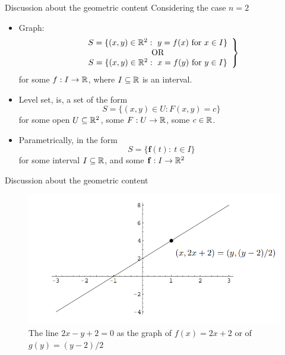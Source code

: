 \begin{frame}{Discussion about the geometric content}
    Considering the case $n = 2$
    \begin{itemize}
        \item Graph: \begin{equation}
        \left. 
        \begin{array}{c}
        S = \{ (x,y) \in \mathbb{R}^2:  \ y = f(x) \text{ for }x\in I\}\\
        \text{OR} \\
        S = \{ (x,y) \in \mathbb{R}^2:  \ x = f(y) \text{ for }y\in I\}
        \end{array}\right\}
        \label{graph}
        \end{equation}
        for some $f:I\to \mathbb{R}$, where $I\subseteq \mathbb{R}$ is an interval.
        \item Level set, is, a set of the form
        \begin{equation}
            S    = \{ (x,y)\in U : F(x,y) = c \} 
        \label{locus}\end{equation}
        for some open $U\subseteq \mathbb{R}^2$, some $F:U\to \mathbb{R}$, some $c\in \mathbb{R}$.
        \item Parametrically, in the form
        \begin{equation}
        S    = \{  \mathbf f(t) :  \ t\in I \} 
        \label{parametrically}\end{equation}
        for some interval $I\subseteq \mathbb{R}$, and some $\mathbf f:I\to \mathbb{R}^2$
    \end{itemize}
\end{frame}

\begin{frame}{Discussion about the geometric content}
    \begin{figure}[h!]
        \includegraphics[width=0.75\linewidth]{figures/implicit_function_example01.png}
        \caption{The line $2x − y + 2 = 0$ as the graph of $f(x) = 2x + 2$ or of $g(y) = (y − 2)/2$}
    \end{figure}
\end{frame}


